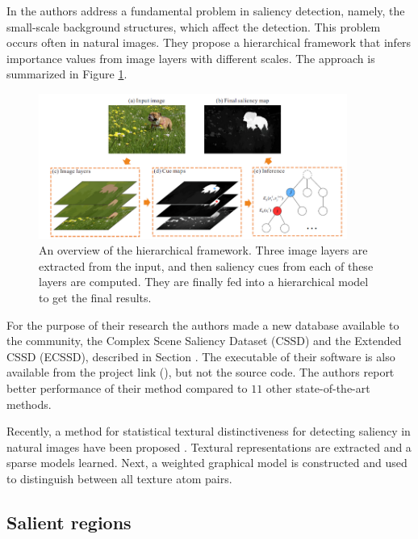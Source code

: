 In \cite{YanCVPR2013} the authors address a fundamental problem in saliency detection, namely, the small-scale background structures, which affect the detection. This problem occurs often in natural images. They propose a hierarchical framework that infers importance values from image layers with different scales. The approach is summarized in Figure \ref{fig:hier_yan13}.

\begin{figure}[H]
\begin{center}
\includegraphics[width=0.9\textwidth]{fig/Hierarchy_Yan13}
\end{center}
\caption{An overview of the hierarchical framework. Three image layers are extracted from the input, and then  saliency cues from each of these layers are computed. They are finally fed into a hierarchical model to get the final results.}
\label{fig:hier_yan13}
\end{figure}

For the purpose of their research the authors made a new database available to the community, the Complex Scene Saliency Dataset (CSSD) and the Extended CSSD (ECSSD), described in Section . The executable of their software is also available from the project link (\cite{ecssd_db}), but not the source code. The authors report better performance of their method compared to $11$ other state-of-the-art methods.

Recently, a method for statistical textural distinctiveness for detecting saliency in natural images have been proposed \cite{texstatdist2013}. Textural representations are extracted and a sparse models learned. Next, a weighted graphical model is constructed and used to distinguish between all texture atom pairs.

\subsection{Salient regions}\label{subsec:salreg}

